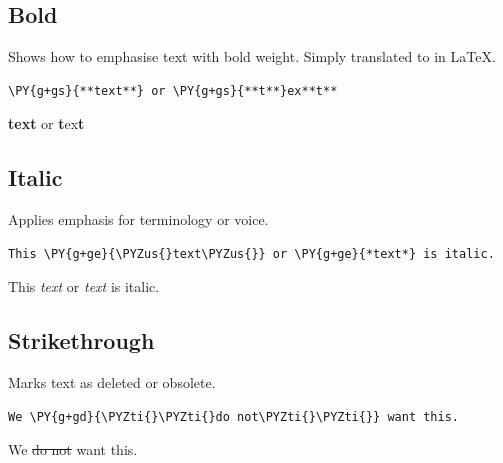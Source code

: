 \documentclass[a4paper,twoside]{article}
\begin{document}
\subsection{Bold}
Shows how to emphasise text with bold weight. Simply translated to  in \LaTeX{}.
\begin{tscode}[lang=md, engine=pygments]
\begin{Verbatim}[commandchars=\\\{\},breaklines, breakanywhere, commandchars=\\\{\}]
\PY{g+gs}{**text**} or \PY{g+gs}{**t**}ex**t**
\end{Verbatim}
\end{tscode}
\begin{displayquote}
\textbf{text} or \textbf{t}ex\textbf{t}
\end{displayquote}
\subsection{Italic}
Applies emphasis for terminology or voice.
\begin{tscode}[lang=md, engine=pygments]
\begin{Verbatim}[commandchars=\\\{\},breaklines, breakanywhere, commandchars=\\\{\}]
This \PY{g+ge}{\PYZus{}text\PYZus{}} or \PY{g+ge}{*text*} is italic.
\end{Verbatim}
\end{tscode}
\begin{displayquote}
This \emph{text} or \emph{text} is italic.
\end{displayquote}
\subsection{Strikethrough}
Marks text as deleted or obsolete.
\begin{tscode}[lang=md, engine=pygments]
\begin{Verbatim}[commandchars=\\\{\},breaklines, breakanywhere, commandchars=\\\{\}]
We \PY{g+gd}{\PYZti{}\PYZti{}do not\PYZti{}\PYZti{}} want this.
\end{Verbatim}
\end{tscode}
\begin{displayquote}
We \sout{do not} want this.
\end{displayquote}
\end{document}
